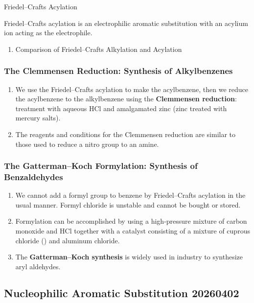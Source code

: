 \begin{mechanism}
    Friedel–Crafts Acylation

    Friedel–Crafts acylation is an electrophilic aromatic substitution with an acylium ion acting as the electrophile.
\end{mechanism}

\begin{enumerate}[resume]
    \item Comparison of Friedel–Crafts Alkylation and Acylation
\end{enumerate}

\subsubsection{The Clemmensen Reduction: Synthesis of Alkylbenzenes}

\begin{enumerate}
    \item We use the Friedel–Crafts acylation to make the acylbenzene, then we reduce the acylbenzene to the alkylbenzene using the \textbf{Clemmensen reduction}: treatment with aqueous HCl and amalgamated zinc (zinc treated with mercury salts).
    \item The reagents and conditions for the Clemmensen reduction are similar to those used to reduce a nitro group to an amine.
\end{enumerate}

\subsubsection{The Gatterman–Koch Formylation: Synthesis of Benzaldehydes}

\begin{enumerate}
    \item We cannot add a formyl group to benzene by Friedel–Crafts acylation in the usual manner. Formyl chloride is unstable and cannot be bought or stored.
    \item Formylation can be accomplished by using a high-pressure mixture of carbon monoxide and HCl together with a catalyst consisting of a mixture of cuprous chloride () and aluminum chloride.
    \item The \textbf{Gatterman–Koch synthesis} is widely used in industry to synthesize aryl aldehydes.
\end{enumerate}

\subsection{Nucleophilic Aromatic Substitution 20260402}


